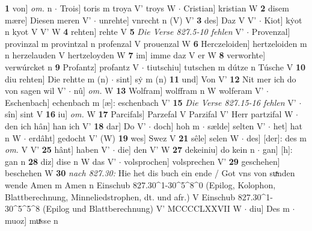 \documentclass[8pt,a4paper,notitlepage]{article}
\begin{document}
\begin{table}[ht]
\begin{minipage}[t]{0.5\linewidth}
\textbf{1} von] \textit{om.} n  $\cdot$ Trois] toris m troya V' troys W  $\cdot$ Cristian] kristian W \textbf{2} disem mære] Diesen meren V'  $\cdot$ unrehte] vnrecht n (V) V' \textbf{3} des] Daz V V'  $\cdot$ Kiot] kẏot n kyot V V' W \textbf{4} rehten] rehte V \textbf{5} \textit{Die Verse 827.5-10 fehlen} V'   $\cdot$ Provenzal] provinzal m provintzal n profenzal V prouenzal W \textbf{6} Herczeloiden] hertzeloiden m n herzelauden V hertzeloyden W \textbf{7} im] imme daz V er W \textbf{8} verworhte] verwúrcket n \textbf{9} Profantz] profantz V  $\cdot$ tiutschiu] tutschen m dútze n Túsche V \textbf{10} diu rehten] Die rehtte m (n)  $\cdot$ sint] sẏ m (n) \textbf{11} und] Von V' \textbf{12} Nit mer ich do von sagen wil V'  $\cdot$ nû] \textit{om.} W \textbf{13} Wolfram] wolffram n W wolferam V'  $\cdot$ Eschenbach] echenbach m [æ]: eschenbach V' \textbf{15} \textit{Die Verse 827.15-16 fehlen} V'   $\cdot$ sîn] sint V \textbf{16} iu] \textit{om.} W \textbf{17} Parcifals] Parzefal V Parzifal V' Herr partzifal W  $\cdot$ den ich hân] han ich V' \textbf{18} dar] Do V'  $\cdot$ doch] hoh m  $\cdot$ sælde] selten V'  $\cdot$ het] hat n W  $\cdot$ erdâht] gedocht V' (W) \textbf{19} wes] Swez V \textbf{21} sêle] selen W  $\cdot$ des] [der]: des m \textit{om.} V V' \textbf{25} hânt] haben V'  $\cdot$ die] den V' W \textbf{27} dekeiniu] do kein n  $\cdot$ gan] [h]: gan n \textbf{28} diz] dise n W das V'  $\cdot$ volsprochen] volsprechen V' \textbf{29} geschehen] beschehen W \textbf{30} \textit{nach 827.30:} Hie het dis buch ein ende / Got vns von suͯnden wende Amen m  Amen n  Einschub 827.30\textasciicircum1-30\textasciicircum5\textasciicircum8\textasciicircum0 (Epilog, Kolophon, Blattberechnung, Minneliedstrophen, dt. und afr.) V  Einschub 827.30\textasciicircum1-30\textasciicircum5\textasciicircum5\textasciicircum8 (Epilog und Blattberechnung) V'  MCCCCLXXVII W   $\cdot$ diu] Des m  $\cdot$ muoz] muͯsse n \newline
\end{minipage}
\end{table}
\newpage
\end{document}
